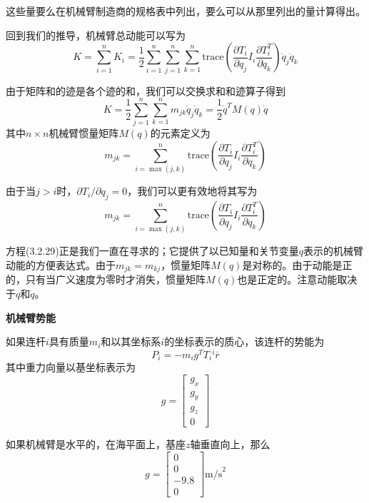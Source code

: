 \documentclass[12pt,a4paper]{ctexart}
\begin{document}
这些量要么在机械臂制造商的规格表中列出，要么可以从那里列出的量计算得出。

回到我们的推导，机械臂总动能可以写为
\begin{equation}
K = \sum_{i=1}^{n}K_i = \frac{1}{2}\sum_{i=1}^{n}\sum_{j=1}^{n}\sum_{k=1}^{n}\text{trace}\left(\frac{\partial T_i}{\partial q_j}I_i\frac{\partial T_i^{T}}{\partial q_k}\right)\dot{q}_j\dot{q}_k
\end{equation}

由于矩阵和的迹是各个迹的和，我们可以交换求和和迹算子得到
\begin{equation}
K = \frac{1}{2}\sum_{j=1}^{n}\sum_{k=1}^{n}m_{jk}\dot{q}_j\dot{q}_k = \frac{1}{2}\dot{q}^T M(q) \dot{q}
\end{equation}
其中$n \times n$机械臂惯量矩阵$M(q)$的元素定义为
\begin{equation}
m_{jk} = \sum_{i=\max(j,k)}^{n}\text{trace}\left(\frac{\partial T_i}{\partial q_j}I_i\frac{\partial T_i^{T}}{\partial q_k}\right)
\end{equation}

由于当$j > i$时，$\partial T_i/\partial q_j = 0$，我们可以更有效地将其写为
\begin{equation}
m_{jk} = \sum_{i=\max(j,k)}^{n}\text{trace}\left(\frac{\partial T_i}{\partial q_j}I_i\frac{\partial T_i^{T}}{\partial q_k}\right)
\end{equation}

方程(3.2.29)正是我们一直在寻求的；它提供了以已知量和关节变量$q$表示的机械臂动能的方便表达式。由于$m_{jk} = m_{kj}$，惯量矩阵$M(q)$是对称的。由于动能是正的，只有当广义速度为零时才消失，惯量矩阵$M(q)$也是正定的。注意动能取决于$q$和$\dot{q}$。

\textbf{机械臂势能}

如果连杆$i$具有质量$m_i$和以其坐标系$i$的坐标表示的质心，该连杆的势能为
\begin{equation}
P_i = -m_i g^T T_i {^i\overline{r}}
\end{equation}
其中重力向量以基坐标表示为
\begin{equation}
g = \begin{bmatrix} g_x \\ g_y \\ g_z \\ 0 \end{bmatrix}
\end{equation}

如果机械臂是水平的，在海平面上，基座$z$轴垂直向上，那么
\begin{equation}
g = \begin{bmatrix} 0 \\ 0 \\ -9.8 \\ 0 \end{bmatrix} \text{m/s}^2
\end{equation}
\end{document}
